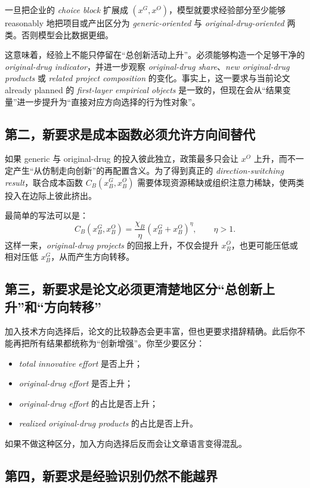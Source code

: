 \documentclass[12pt]{ctexart}
\begin{document}
一旦把企业的 \textit{choice block} 扩展成 $(x^G,x^O)$，模型就要求经验部分至少能够 reasonably 地把项目或产出区分为 \textit{generic-oriented} 与 \textit{original-drug-oriented} 两类。否则模型会比数据更细。

这意味着，经验上不能只停留在“总创新活动上升”。必须能够构造一个足够干净的 \textit{original-drug indicator}，并进一步观察 \textit{original-drug share}、\textit{new original-drug products} 或 \textit{related project composition} 的变化。事实上，这一要求与当前论文 already planned 的 \textit{first-layer empirical objects} 是一致的，但现在会从“结果变量”进一步提升为“直接对应方向选择的行为性对象”。

\subsection{第二，新要求是成本函数必须允许方向间替代}

如果 generic 与 original-drug 的投入彼此独立，政策最多只会让 $x^O$ 上升，而不一定产生“从仿制走向创新”的再配置含义。为了得到真正的 \textit{direction-switching result}，联合成本函数 $C_B(x_B^G,x_B^O)$ 需要体现资源稀缺或组织注意力稀缺，使两类投入在边际上彼此挤出。

最简单的写法可以是：
\[
C_B(x_B^G,x_B^O)=\frac{\chi_B}{\eta}(x_B^G+x_B^O)^{\eta},\qquad \eta>1.
\]
这样一来，\textit{original-drug projects} 的回报上升，不仅会提升 $x_B^O$，也更可能压低或相对压低 $x_B^G$，从而产生方向转移。

\subsection{第三，新要求是论文必须更清楚地区分“总创新上升”和“方向转移”}

加入技术方向选择后，论文的比较静态会更丰富，但也更要求措辞精确。此后你不能再把所有结果都统称为“创新增强”。你至少要区分：
\begin{itemize}[leftmargin=2em]
    \item \textit{total innovative effort} 是否上升；
    \item \textit{original-drug effort} 是否上升；
    \item \textit{original-drug effort} 的占比是否上升；
    \item \textit{realized original-drug products} 的占比是否上升。
\end{itemize}
如果不做这种区分，加入方向选择后反而会让文章语言变得混乱。

\subsection{第四，新要求是经验识别仍然不能越界}
\end{document}
